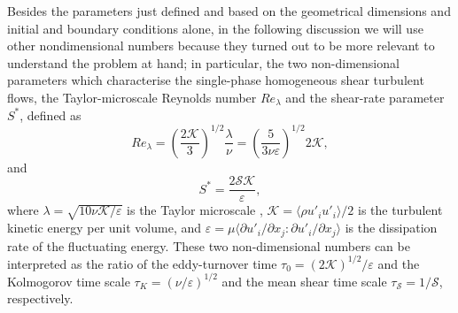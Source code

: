 Besides the parameters just defined and based on the geometrical dimensions and initial and boundary conditions alone, in the following discussion we will use other nondimensional numbers because they turned out to be more relevant to understand the problem at hand; in particular, the two non-dimensional parameters which characterise the single-phase homogeneous shear turbulent flows, the Taylor-microscale Reynolds number $Re_\lambda$ and the shear-rate parameter $S^*$, defined as
\begin{equation}
\label{eq:rel}
Re_\lambda = \left( \frac{2\mathcal{K} }{3} \right)^{1/2} \frac{\lambda}{\nu} = \left( \frac{5}{3 \nu \varepsilon } \right)^{1/2} 2\mathcal{K},
\end{equation}
and
\begin{equation}
\label{eq:ss}
S^* = \frac{2 \mathcal{S} \mathcal{K} }{\varepsilon},
\end{equation}
where $\lambda = \sqrt{10\nu \mathcal{K}/\varepsilon}$ is the Taylor microscale \citep{sekimoto_dong_jimenez_2016a}, $\mathcal{K} = \langle \rho u'_i u'_i \rangle/2$ is the turbulent kinetic energy per unit volume, and $\varepsilon = \mu \langle \partial u'_i/\partial x_j : \partial u'_i/\partial x_j \rangle$ is the dissipation rate of the fluctuating energy. These two non-dimensional numbers can be interpreted as the ratio of the eddy-turnover time $\tau_0= \left( 2\mathcal{K} \right)^{1/2}/\varepsilon$ and the Kolmogorov time scale $\tau_K= \left( \nu / \varepsilon \right)^{1/2}$ and the mean shear time scale $\tau_\mathcal{S} = 1/ \mathcal{S}$, respectively.

